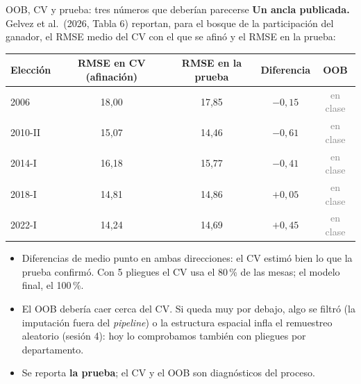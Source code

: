 \documentclass{beamer}
\newcommand{\1}{\mathbb{I}}
\begin{document}
\begin{frame}{OOB, CV y prueba: tres números que deberían parecerse}
\small
\textbf{Un ancla publicada.} Gelvez et al.\ (2026, Tabla 6) reportan, para el bosque de la participación del ganador, el RMSE medio del CV con el que se afinó y el RMSE en la prueba:
\begin{center}
\footnotesize
\setlength{\tabcolsep}{6pt}
\begin{tabular}{lcccc}
\hline
Elección & RMSE en CV (afinación) & RMSE en la prueba & Diferencia & OOB \\
\hline
2006 & 18,00 & 17,85 & $-0{,}15$ & \textcolor{gray}{en clase} \\
2010-II & 15,07 & 14,46 & $-0{,}61$ & \textcolor{gray}{en clase} \\
2014-I & 16,18 & 15,77 & $-0{,}41$ & \textcolor{gray}{en clase} \\
2018-I & 14,81 & 14,86 & $+0{,}05$ & \textcolor{gray}{en clase} \\
2022-I & 14,24 & 14,69 & $+0{,}45$ & \textcolor{gray}{en clase} \\
\hline
\end{tabular}
\end{center}
\pause
\begin{itemize}\itemsep3pt
  \item Diferencias de medio punto en ambas direcciones: el CV estimó bien lo que la prueba confirmó. Con 5 pliegues el CV usa el 80\,\% de las mesas; el modelo final, el 100\,\%. \pause
  \item El OOB debería caer cerca del CV. Si queda muy por debajo, algo se filtró (la imputación fuera del \emph{pipeline}) o la estructura espacial infla el remuestreo aleatorio (sesión 4): hoy lo comprobamos también con pliegues por departamento. \pause
  \item Se reporta \textbf{la prueba}; el CV y el OOB son diagnósticos del proceso.
\end{itemize}
\end{frame}
\end{document}
